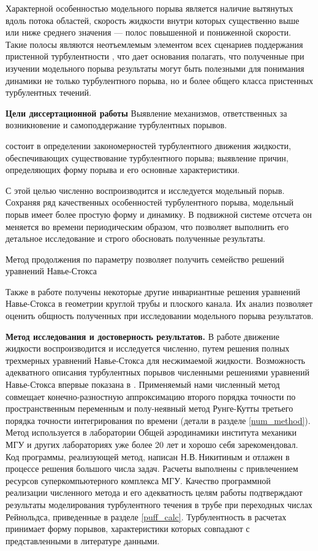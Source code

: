 Характерной особенностью модельного порыва является наличие вытянутых вдоль потока областей, скорость жидкости внутри которых существенно выше или ниже среднего значения --- полос повышенной и пониженной скорости. Такие полосы являются неотъемлемым элементом всех сценариев поддержания пристенной турбулентности \cite{Hamilton1995, Waleffe1997, Schoppa2002}, что дает основания полагать, что полученные при изучении модельного порыва результаты могут быть полезными для понимания динамики не только турбулентного порыва, но и более общего класса пристенных турбулентных течений. 


{\bf Цели диссертационной работы} 	
Выявление механизмов, ответственных за возникновение и  самоподдержание турбулентных порывов.

состоит в определении закономерностей турбулентного движения жидкости, обеспечивающих существование турбулентного порыва; выявление причин, определяющих форму порыва и его основные характеристики. 

С этой целью численно воспроизводится и исследуется модельный порыв. Сохраняя ряд качественных особенностей турбулентного порыва, модельный порыв имеет более простую форму и динамику. В подвижной системе отсчета он меняется во времени периодическим образом, что позволяет выполнить его детальное исследование и строго обосновать полученные результаты. 

Метод продолжения по параметру позволяет получить семейство решений уравнений Навье-Стокса

Также в работе получены некоторые другие инвариантные решения уравнений Навье-Стокса в геометрии круглой трубы и плоского канала. Их анализ позволяет оценить общность полученных при исследовании модельного порыва результатов. 


{\bf Метод исследования и достоверность результатов.}
В работе движение жидкости воспроизводится и исследуется численно, путем решения полных трехмерных уравнений Навье-Стокса для несжимаемой жидкости. Возможность адекватного описания турбулентных порывов численными решениями уравнений Навье-Стокса впервые показана в \cite{Priymak2004}. Применяемый нами численный метод совмещает конечно-разностную аппроксимацию второго порядка точности по пространственным переменным и полу-неявный метод Рунге-Кутты третьего порядка точности интегрирования по времени \cite{Nikitin2006, Nikitin2006third} (детали в разделе \ref{num_method}). Метод используется в лаборатории Общей аэродинамики института механики МГУ и других лабораториях уже более 20 лет и хорошо себя зарекомендовал. Код программы, реализующей метод, написан Н.В.\,Никитиным и отлажен в процессе решения большого числа задач. Расчеты выполнены с привлечением ресурсов суперкомпьютерного комплекса МГУ. Качество программной реализации численного метода и его адекватность целям работы подтверждают результаты моделирования турбулентного течения в трубе при переходных числах Рейнольдса, приведенные в разделе \ref{puff_calc}. Турбулентность в расчетах принимает форму порывов, характеристики которых совпадают с представленными в литературе данными. 

